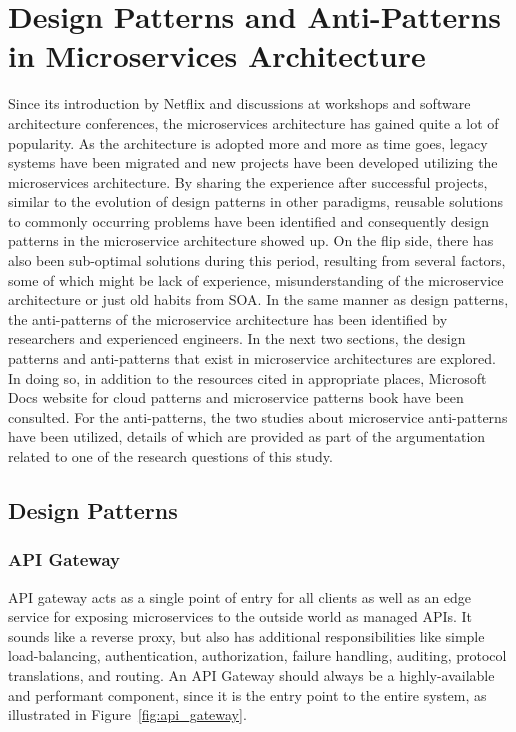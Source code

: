 \documentclass{Configuration_Files/PoliMi3i_thesis}
\begin{document}
\section{Design Patterns and Anti-Patterns in Microservices Architecture}
\label{sec:patterns}

Since its introduction by Netflix and discussions at workshops and software architecture conferences, the microservices architecture has gained quite a lot of popularity.
As the architecture is adopted more and more as time goes, legacy systems have been migrated and new projects have been developed utilizing the microservices architecture.
By sharing the experience after successful projects, similar to the evolution of design patterns in other paradigms, reusable solutions to commonly occurring problems have been identified and consequently design patterns in the microservice architecture showed up.
On the flip side, there has also been sub-optimal solutions during this period, resulting from several factors, some of which might be lack of experience, misunderstanding of the microservice architecture or just old habits from SOA.
In the same manner as design patterns, the anti-patterns of the microservice architecture has been identified by researchers and experienced engineers.
In the next two sections, the design patterns and anti-patterns that exist in microservice architectures are explored.
In doing so, in addition to the resources cited in appropriate places, Microsoft Docs website for cloud patterns \cite{microsoft_docs} and microservice patterns book \cite{richardson_book} have been consulted.
For the anti-patterns, the two studies about microservice anti-patterns \cite{10.1145/3424771.3424812}\cite{9522227} have been utilized, details of which are provided as part of the argumentation related to one of the research questions of this study.

\subsection{Design Patterns}
\label{subsec:designpattern}

\subsubsection{API Gateway}
\label{subsubsec:api_gateway}

API gateway acts as a single point of entry for all clients as well as an edge service for exposing microservices to the outside world as managed APIs.
It sounds like a reverse proxy, but also has additional responsibilities like simple load-balancing, authentication, authorization, failure handling, auditing, protocol translations, and routing. An API Gateway should always be a highly-available and performant component, since it is the entry point to the entire system, as illustrated in Figure~\ref{fig:api_gateway}.
\end{document}
